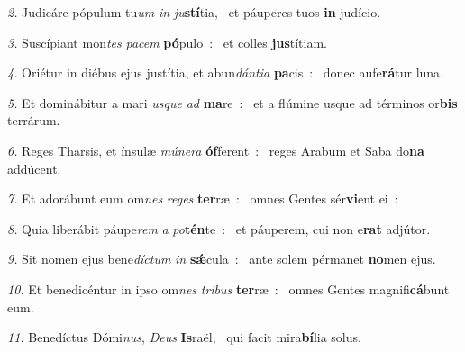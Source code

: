 \begin{psalmus}
\textit{\color{red}2.} Judicáre pópulum tu\textit{um} \textit{in} \textit{ju}\textbf{stí}tia,~\grestar{}
et páuperes tuos \textbf{in} judício.~\Abardot{}

\textit{\color{red}3.} Suscípiant mon\textit{tes} \textit{pa}\textit{cem} \textbf{pó}pulo~:~\grestar{}
et colles \textbf{jus}títiam.~\Abardot{}

\textit{\color{red}4.} Oriétur in diébus ejus justítia, et abun\textit{dán}\textit{ti}\textit{a} \textbf{pa}cis~:~\grestar{}
donec aufe\textbf{rá}tur luna.~\Abardot{}

\textit{\color{red}5.} Et dominábitur a mari \textit{us}\textit{que} \textit{ad} \textbf{ma}re~:~\grestar{}
et a flúmine usque ad términos or\textbf{bis} terrárum.~\Abardot{}

\textit{\color{red}6.} Reges Tharsis, et ínsulæ \textit{mú}\textit{ne}\textit{ra} \textbf{óf}ferent~:~\grestar{}
reges Arabum et Saba do\textbf{na} addúcent.~\Abardot{}

\textit{\color{red}7.} Et adorábunt eum om\textit{nes} \textit{re}\textit{ges} \textbf{ter}ræ~:~\grestar{}
omnes Gentes sér\textbf{vi}ent \hbox{ei~:~\Abardot{}}

\textit{\color{red}8.} Quia liberábit páupe\textit{rem} \textit{a} \textit{po}\textbf{tén}te~:~\grestar{}
et páuperem, cui non e\textbf{rat} adjútor.~\Abardot{}

\textit{\color{red}9.} Sit nomen ejus bene\textit{dí}\textit{ctum} \textit{in} \textbf{sǽ}cula~:~\grestar{}
ante solem pérmanet \textbf{no}men ejus.~\Abardot{}

\textit{\color{red}10.} Et benedicéntur in ipso om\textit{nes} \textit{tri}\textit{bus} \textbf{ter}ræ~:~\grestar{}
omnes Gentes magnifi\textbf{cá}bunt eum.~\Abardot{}

\textit{\color{red}11.} Benedíctus Dómi\textit{nus}, \textit{De}\textit{us} \textbf{Is}raël,~\grestar{}
qui facit mira\textbf{bí}lia solus.~\Abardot{}
\end{psalmus}
